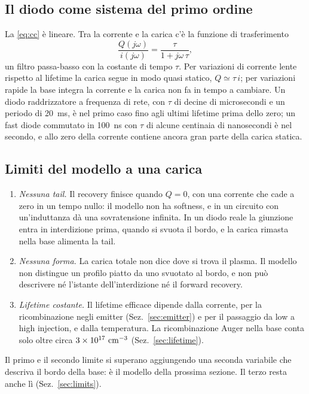 \documentclass[10pt,a4paper]{scrartcl}
\let\newcommand\pdvaluedefine
\newcommand{\cmc}{\si{\centi\metre^{-3}}}
\begin{document}
\subsection{Il diodo come sistema del primo ordine}
\label{sec:ccsystem}
La \eqref{eq:cc} è lineare. Tra la corrente e la carica c'è la funzione di trasferimento
\begin{equation}
\frac{Q(j\omega)}{i(j\omega)} = \frac{\tau}{1 + j\omega\,\tau} ,
\label{eq:cctf}
\end{equation}
un filtro passa-basso con la costante di tempo $\tau$. Per variazioni di corrente lente rispetto al lifetime la carica segue in modo quasi statico, $Q \simeq \tau\,i$; per variazioni rapide la base integra la corrente e la carica non fa in tempo a cambiare. Un diodo raddrizzatore a frequenza di rete, con $\tau$ di decine di microsecondi e un periodo di \SI{20}{\milli\second}, è nel primo caso fino agli ultimi lifetime prima dello zero; un fast diode commutato in \SI{100}{\nano\second} con $\tau$ di alcune centinaia di nanosecondi è nel secondo, e allo zero della corrente contiene ancora gran parte della carica statica.

\subsection{Limiti del modello a una carica}
\label{sec:cclimits}
\begin{enumerate}
\item \emph{Nessuna tail.} Il recovery finisce quando $Q = 0$, con una corrente che cade a zero in un tempo nullo: il modello non ha softness, e in un circuito con un'induttanza dà una sovratensione infinita. In un diodo reale la giunzione entra in interdizione prima, quando si svuota il bordo, e la carica rimasta nella base alimenta la tail.
\item \emph{Nessuna forma.} La carica totale non dice dove si trova il plasma. Il modello non distingue un profilo piatto da uno svuotato al bordo, e non può descrivere né l'istante dell'interdizione né il forward recovery.
\item \emph{Lifetime costante.} Il lifetime efficace dipende dalla corrente, per la ricombinazione negli emitter (Sez.~\ref{sec:emitter}) e per il passaggio da low a high injection, e dalla temperatura. La ricombinazione Auger nella base conta solo oltre circa $3\times10^{17}\ \cmc$ (Sez.~\ref{sec:lifetime}).
\end{enumerate}
Il primo e il secondo limite si superano aggiungendo una seconda variabile che descriva il bordo della base: è il modello della prossima sezione. Il terzo resta anche lì (Sez.~\ref{sec:limits}).
\end{document}
